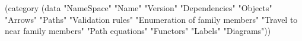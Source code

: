 

(category
 (data
  "NameSpace"
  "Name"
  "Version"
  "Dependencies"
  "Objects"
  "Arrows"
  "Paths"
  "Validation rules"
  "Enumeration of family members"
  "Travel to near family members"
  "Path equations"
  "Functors"
  "Labels"
  "Diagrams"))
